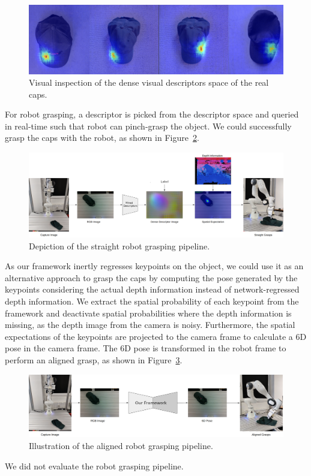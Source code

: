 \begin{figure}[htb]
    \centering
    \includegraphics[scale=0.15]{images/test_real_caps.png}
    \caption{Visual inspection of the dense visual descriptors space of the real caps.}
    \label{fig:check_real_caps}
\end{figure}

For robot grasping, a descriptor is picked from the descriptor space and queried in real-time such that robot can pinch-grasp the object.
We could successfully grasp the caps with the robot, as shown in Figure~\ref{fig:straight_grasp}.

\begin{figure}[htb]
    \centering
    \includegraphics[scale=0.15]{images/straight_grasps.png}
    \caption{Depiction of the straight robot grasping pipeline.}
    \label{fig:straight_grasp}
\end{figure}

As our framework inertly regresses keypoints on the object, we could use it as an alternative approach to grasp the caps by computing the pose
generated by the keypoints considering the actual depth information instead of network-regressed depth information.
We extract the spatial probability of each keypoint from the framework and deactivate spatial probabilities where the depth information is missing,
as the depth image from the camera is noisy. Furthermore, the spatial expectations of the keypoints are projected to the camera frame
to calculate a 6D pose in the camera frame. The 6D pose is transformed in the robot frame to perform an aligned grasp, as shown in Figure~\ref{fig:aligned_grasp}.

\begin{figure}[htb]
    \centering
    \includegraphics[scale=0.17]{images/aligned.png}
    \caption{Illustration of the aligned robot grasping pipeline.}
    \label{fig:aligned_grasp}
\end{figure}

We did not evaluate the robot grasping pipeline.